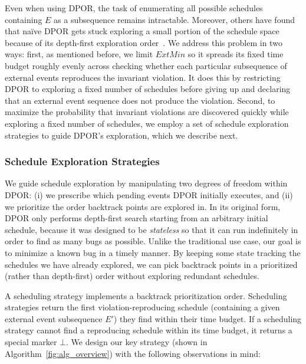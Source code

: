Even when using DPOR, the task of enumerating all possible schedules containing $E$ as a
subsequence remains intractable. Moreover, others have found that na\"ive DPOR
gets stuck exploring a small portion of the schedule space because of its
depth-first exploration order~\cite{lin2009modist}.
We address this problem in two ways: first, as mentioned before, we limit
$ExtMin$ so it spreads its fixed time budget roughly evenly across
checking whether each particular subsequence of external events reproduces the invariant violation. It does this by
restricting DPOR to exploring a fixed number of schedules before
giving up and declaring that an external event sequence does not produce the violation. Second, to maximize the probability that
invariant violations are discovered quickly while exploring a fixed number of
schedules, we employ a set of schedule exploration strategies to guide
DPOR's exploration, which we describe next.

\subsubsection{Schedule Exploration Strategies}
\label{subsec:exploration_strategies}

We guide schedule exploration by manipulating two degrees of freedom within
DPOR: (i) we prescribe which pending events DPOR initially
executes, and (ii) we prioritize the order backtrack points are explored in.
In its original form, DPOR only performs
depth-first search starting from an arbitrary initial schedule, because it was designed to be {\em
stateless} so that it can run indefinitely in order to find as
many bugs as possible. Unlike the traditional use case, our goal is to minimize a known bug in a
timely manner. By keeping some state tracking the schedules we have already explored, we can pick
backtrack points in a prioritized (rather than depth-first) order without exploring redundant schedules.

A scheduling strategy implements a backtrack prioritization order.
Scheduling strategies return the first violation-reproducing schedule
(containing a given external event subsequence $E'$) they
find within their time budget. If a scheduling strategy cannot find a
reproducing schedule within its time budget, it returns a special marker $\bot$.
We design our key strategy (shown in
Algorithm~\ref{fig:alg_overview})
with the following observations in mind:

